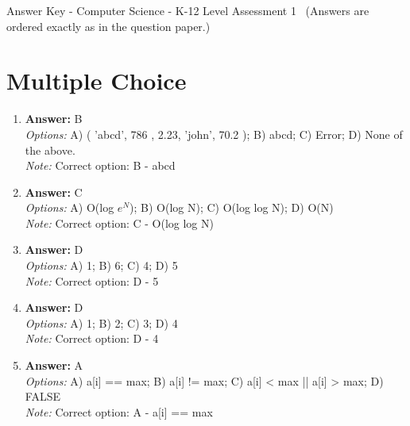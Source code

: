 \documentclass[12pt]{article}
\begin{document}
\begin{center}
Answer Key - Computer Science - K-12 Level Assessment 1 \
\small (Answers are ordered exactly as in the question paper.)
\end{center}

\section*{Multiple Choice}
\begin{enumerate}[label=\arabic*.]
\item \textbf{Answer:} B
\\ \textit{Options:} A) ( 'abcd', 786 , 2.23, 'john', 70.2 ); B) abcd; C) Error; D) None of the above.
\\ \textit{Note:} Correct option: B - abcd
\item \textbf{Answer:} C
\\ \textit{Options:} A) O(log $e^N$); B) O(log N); C) O(log log N); D) O(N)
\\ \textit{Note:} Correct option: C - O(log log N)
\item \textbf{Answer:} D
\\ \textit{Options:} A) 1; B) 6; C) 4; D) 5
\\ \textit{Note:} Correct option: D - 5
\item \textbf{Answer:} D
\\ \textit{Options:} A) 1; B) 2; C) 3; D) 4
\\ \textit{Note:} Correct option: D - 4
\item \textbf{Answer:} A
\\ \textit{Options:} A) a[i] == max; B) a[i] != max; C) a[i] \textless{} max || a[i] \textgreater{} max; D) FALSE
\\ \textit{Note:} Correct option: A - a[i] == max
\end{enumerate}
\end{document}

